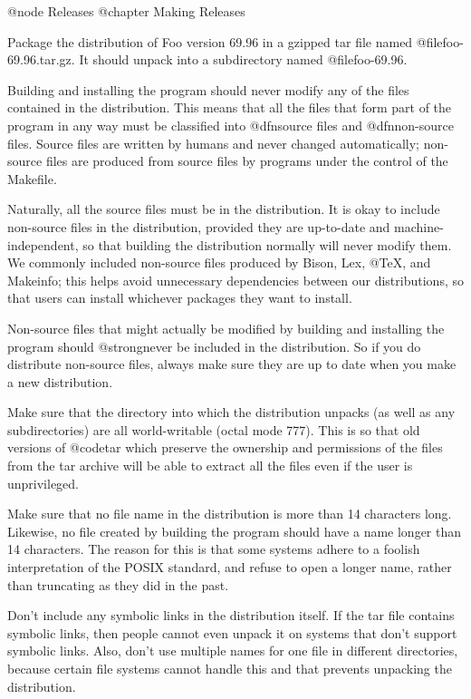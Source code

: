 @node Releases
@chapter Making Releases

Package the distribution of Foo version 69.96 in a gzipped tar file
named @file{foo-69.96.tar.gz}.  It should unpack into a subdirectory
named @file{foo-69.96}.

Building and installing the program should never modify any of the files
contained in the distribution.  This means that all the files that form
part of the program in any way must be classified into @dfn{source
files} and @dfn{non-source files}.  Source files are written by humans
and never changed automatically; non-source files are produced from
source files by programs under the control of the Makefile.

Naturally, all the source files must be in the distribution.  It is okay
to include non-source files in the distribution, provided they are
up-to-date and machine-independent, so that building the distribution
normally will never modify them.  We commonly included non-source files
produced by Bison, Lex, @TeX{}, and Makeinfo; this helps avoid
unnecessary dependencies between our distributions, so that users can
install whichever packages they want to install.

Non-source files that might actually be modified by building and
installing the program should @strong{never} be included in the
distribution.  So if you do distribute non-source files, always make
sure they are up to date when you make a new distribution.

Make sure that the directory into which the distribution unpacks (as
well as any subdirectories) are all world-writable (octal mode 777).
This is so that old versions of @code{tar} which preserve the
ownership and permissions of the files from the tar archive will be
able to extract all the files even if the user is unprivileged. 

Make sure that no file name in the distribution is more than 14
characters long.  Likewise, no file created by building the program
should have a name longer than 14 characters.  The reason for this is
that some systems adhere to a foolish interpretation of the POSIX
standard, and refuse to open a longer name, rather than truncating as
they did in the past.

Don't include any symbolic links in the distribution itself.  If the tar
file contains symbolic links, then people cannot even unpack it on
systems that don't support symbolic links.  Also, don't use multiple
names for one file in different directories, because certain file
systems cannot handle this and that prevents unpacking the
distribution.

